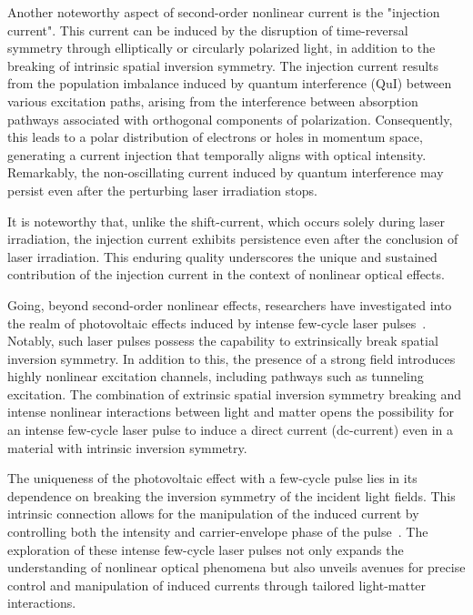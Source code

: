 Another noteworthy aspect of second-order nonlinear current is the "injection
current"\cite{sipe2000second,laman2005ultrafast,
	10.1063/1.125084,PhysRevB.61.5337,10.1063/1.2131191}. This current can be induced by the disruption
of time-reversal symmetry through elliptically or circularly polarized light, in addition to the
breaking of intrinsic spatial inversion symmetry. The injection current results from the population
imbalance induced by quantum interference (\gls{QuI}) between various excitation paths, arising
from the interference between absorption pathways associated with orthogonal components of
polarization. Consequently, this leads to a polar distribution of electrons or holes in momentum
space, generating a current injection that temporally aligns with optical intensity. Remarkably,
the non-oscillating current induced by quantum interference may persist even after the perturbing
laser irradiation stops.

It is noteworthy that, unlike the shift-current, which occurs solely during laser irradiation, the injection current exhibits persistence even after the conclusion of laser irradiation. This enduring quality underscores the unique and sustained contribution of the injection current in the context of nonlinear optical effects.

Going, beyond second-order nonlinear effects, researchers have investigated into the realm of
photovoltaic effects induced by intense few-cycle laser
pulses~\cite{Schiffrin2013,PhysRevLett.113.087401,PhysRevLett.116.057401,Higuchi2017,Heide_2020,Morimoto_2022}.
Notably, such laser pulses possess the capability to extrinsically break spatial inversion
symmetry. In addition to this, the presence of a strong field introduces highly nonlinear
excitation channels, including pathways such as tunneling excitation. The combination of extrinsic spatial inversion symmetry breaking and intense nonlinear interactions between light and matter opens the possibility for an intense few-cycle laser pulse to induce a direct current (dc-current) even in a material with intrinsic inversion symmetry.


The uniqueness of the photovoltaic effect with a few-cycle pulse lies in its dependence on breaking the inversion symmetry of the incident light fields. This intrinsic connection allows for the manipulation of the induced current by controlling both the intensity and carrier-envelope phase of the pulse~\cite{Schiffrin2013,Higuchi2017}. The exploration of these intense few-cycle laser pulses not only expands the understanding of nonlinear optical phenomena but also unveils avenues for precise control and manipulation of induced currents through tailored light-matter interactions.


